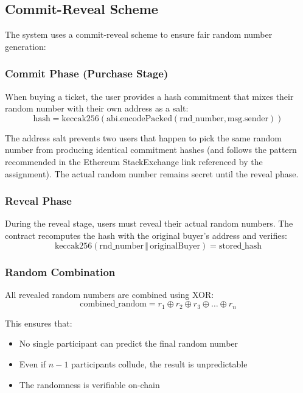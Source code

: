 \documentclass[12pt,a4paper]{article}
\begin{document}
\subsection{Commit-Reveal Scheme}

The system uses a commit-reveal scheme to ensure fair random number generation:

\subsubsection{Commit Phase (Purchase Stage)}

When buying a ticket, the user provides a hash commitment that mixes
their random number with their own address as a salt:
\begin{equation}
    \text{hash} = \text{keccak256}(\text{abi.encodePacked}(\text{rnd\_number}, \text{msg.sender}))
\end{equation}

The address salt prevents two users that happen to pick the same random
number from producing identical commitment hashes (and follows the pattern
recommended in the Ethereum StackExchange link referenced by the assignment).
The actual random number remains secret until the reveal phase.

\subsubsection{Reveal Phase}

During the reveal stage, users must reveal their actual random numbers. The contract recomputes the hash with the original buyer's address and verifies:
\begin{equation}
    \text{keccak256}(\text{rnd\_number} \,\Vert\, \text{originalBuyer}) = \text{stored\_hash}
\end{equation}

\subsubsection{Random Combination}

All revealed random numbers are combined using XOR:
\begin{equation}
    \text{combined\_random} = r_1 \oplus r_2 \oplus r_3 \oplus \ldots \oplus r_n
\end{equation}

This ensures that:
\begin{itemize}
    \item No single participant can predict the final random number
    \item Even if $n-1$ participants collude, the result is unpredictable
    \item The randomness is verifiable on-chain
\end{itemize}
\end{document}
